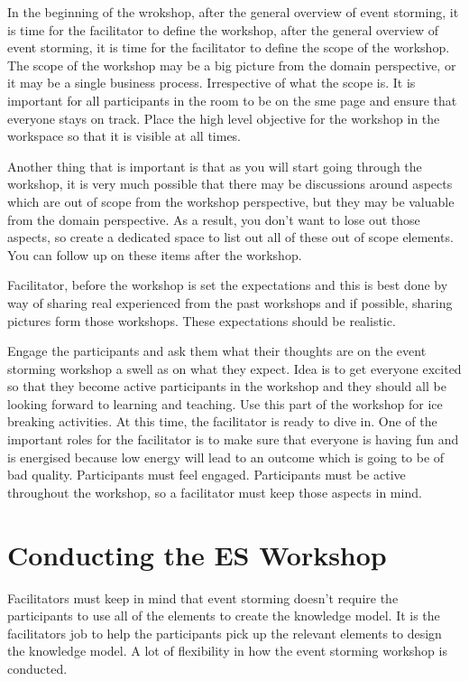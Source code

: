 \documentclass[a4paper, 11pt]{book}
\begin{document}
    In the beginning of the wrokshop, after the general overview of event storming, it is time for the facilitator to define the workshop, after the general overview of event storming, it is time for the facilitator to define the scope of the workshop.
    The scope of the workshop may be a big picture from the domain perspective, or it may be a single business process.
    Irrespective of what the scope is.
    It is important for all participants in the room to be on the sme page and ensure that everyone stays on track.
    Place the high level objective for the workshop in the workspace so that it is visible at all times.

    Another thing that is important is that as you will start going through the workshop, it is very much possible that there may be discussions around aspects which are out of scope from the workshop perspective, but they may be valuable from the domain perspective.
    As a result, you don't want to lose out those aspects, so create a dedicated space to list out all of these out of scope elements.
    You can follow up on these items after the workshop.

    Facilitator, before the workshop is set the expectations and this is best done by way of sharing real experienced from the past workshops and if possible, sharing pictures form those workshops.
    These expectations should be realistic.

    Engage the participants and ask them what their thoughts are on the event storming workshop a swell as on what they expect.
    Idea is to get everyone excited so that they become active participants in the workshop and they should all be looking forward to learning and teaching.
    Use this part of the workshop for ice breaking activities.
    At this time, the facilitator is ready to dive in.
    One of the important roles for the facilitator is to make sure that everyone is having fun and is energised because low energy will lead to an outcome which is going to be of bad quality.
    Participants must feel engaged.
    Participants must be active throughout the workshop, so a facilitator must keep those aspects in mind.


    \section{Conducting the ES Workshop}

    Facilitators must keep in mind that event storming doesn't require the participants to use all of the elements to create the knowledge model.
    It is the facilitators job to help the participants pick up the relevant elements to design the knowledge model.
    A lot of flexibility in how the event storming workshop is conducted.
\end{document}
